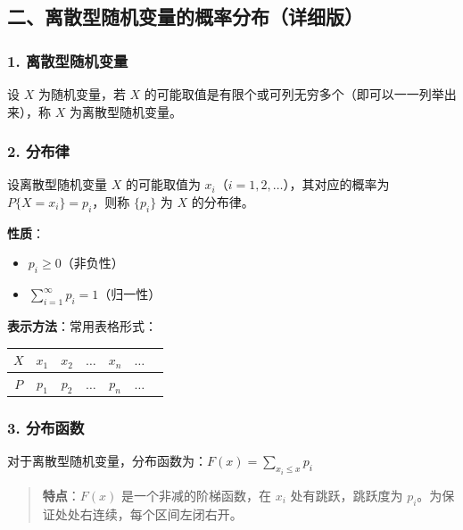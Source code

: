 \documentclass[12pt,a4paper]{ctexart}
\newenvironment{myquote}
  {\par\vspace{0.5em}\begin{quote}\sffamily\color{gray}}
  {\end{quote}\vspace{0.5em}}
\begin{document}
\subsection{二、离散型随机变量的概率分布（详细版）}

\subsubsection{1. 离散型随机变量}
设 $X$ 为随机变量，若 $X$ 的可能取值是有限个或可列无穷多个（即可以一一列举出来），称 $X$ 为离散型随机变量。

\subsubsection{2. 分布律}
设离散型随机变量 $X$ 的可能取值为 $x_i$（$i = 1,2,\dots$），其对应的概率为 $P\{X = x_i\} = p_i$，则称 $\{p_i\}$ 为 $X$ 的分布律。

\textbf{性质}：
\begin{itemize}[noitemsep]
    \item $p_i \ge 0$（非负性）
    \item $\sum_{i=1}^{\infty} p_i = 1$（归一性）
\end{itemize}

\textbf{表示方法}：常用表格形式：

\begin{center}
    \begin{tabular}{@{}c|cccccc@{}}
        \toprule
        $X$ & $x_1$ & $x_2$ & $\dots$ & $x_n$ & $\dots$ \\
        \midrule
        $P$ & $p_1$ & $p_2$ & $\dots$ & $p_n$ & $\dots$ \\
        \bottomrule
    \end{tabular}
\end{center}

\subsubsection{3. 分布函数}
对于离散型随机变量，分布函数为：$\displaystyle F(x) = \sum_{x_i \le x} p_i$

\begin{myquote}
    \textbf{特点}：$F(x)$ 是一个非减的阶梯函数，在 $x_i$ 处有跳跃，跳跃度为 $p_i$。为保证处处右连续，每个区间左闭右开。
\end{myquote}

\end{document}
